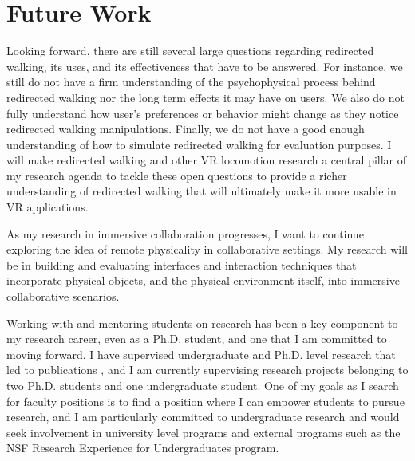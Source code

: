 \section*{Future Work}
\vspace{-0.25cm}
Looking forward, there are still several large questions regarding redirected walking, its uses, and its effectiveness that have to be answered. For instance, we still do not have a firm understanding of the psychophysical process behind redirected walking nor the long term effects it may have on users. We also do not fully understand how user's preferences or behavior might change as they notice redirected walking manipulations. Finally, we do not have a good enough understanding of how to simulate redirected walking for evaluation purposes. I will make redirected walking and other VR locomotion research a central pillar of my research agenda to tackle these open questions to provide a richer understanding of redirected walking that will ultimately make it more usable in VR applications.

As my research in immersive collaboration progresses, I want to continue exploring the idea of remote physicality in collaborative settings. My research will be in building and evaluating interfaces and interaction techniques that incorporate physical objects, and the physical environment itself, into immersive collaborative scenarios.  

Working with and mentoring students on research has been a key component to my research career, even as a Ph.D. student, and one that I am committed to moving forward. I have supervised undergraduate and Ph.D. level research that led to publications \cite{you2019strafing, adeniyi2021red, you2022strafing}, and I am currently supervising research projects belonging to two Ph.D. students and one undergraduate student. One of my goals as I search for faculty positions is to find a position where I can empower students to pursue research, and I am particularly committed to undergraduate research and would seek involvement in university level programs and external programs such as 
the NSF Research Experience for Undergraduates program.




\label{research_last}
